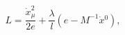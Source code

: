 \begin{equation}
L=\frac{\dot{x}_\mu^{2}}{2e}
+\frac{\lambda}{l}(e-M^{-1}\dot{x}{}^0),
\label{inter}
\end{equation}

